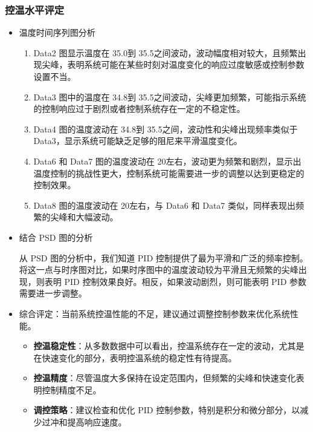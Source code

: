\documentclass[dvipsnames, svgnames,a4paper,11pt]{article}
\begin{document}
	\subsubsection{控温水平评定}
	\begin{itemize}
		\item 温度时间序列图分析
		\begin{enumerate}
			\item Data2 图显示温度在 35.0\degree 到 35.5\degree 之间波动，波动幅度相对较大，且频繁出现尖峰，表明系统可能在某些时刻对温度变化的响应过度敏感或控制参数设置不当。
			
			\item Data3 图中的温度在 34.8\degree 到 35.5\degree 之间波动，尖峰更加频繁，可能指示系统的控制响应过于剧烈或者控制系统存在一定的不稳定性。
			
			\item Data4 图的温度波动在 34.8\degree 到 35.5\degree 之间，波动性和尖峰出现频率类似于 Data3，显示系统可能缺乏足够的阻尼来平滑温度变化。
			
			\item Data6 和 Data7 图的温度波动在 20\degree 左右，波动更为频繁和剧烈，显示出温度控制的挑战性更大，控制系统可能需要进一步的调整以达到更稳定的控制效果。
			
			\item Data8 图的温度波动在 20\degree 左右，与 Data6 和 Data7 类似，同样表现出频繁的尖峰和大幅波动。
		\end{enumerate}
		
		\item 结合 PSD 图的分析
		
		从 PSD 图的分析中，我们知道 PID 控制提供了最为平滑和广泛的频率控制。将这一点与时序图对比，如果时序图中的温度波动较为平滑且无频繁的尖峰出现，则表明 PID 控制效果良好。相反，如果波动剧烈，则可能表明 PID 参数需要进一步调整。
		
		
		\item 综合评定：当前系统控温性能的不足，建议通过调整控制参数来优化系统性能。
		\begin{itemize}
			\item \textbf{控温稳定性}：从多数数据中可以看出，控温系统存在一定的波动，尤其是在快速变化的部分，表明控温系统的稳定性有待提高。
			
			\item \textbf{控温精度}：尽管温度大多保持在设定范围内，但频繁的尖峰和快速变化表明控制精度不足。
			
			\item \textbf{调控策略}：建议检查和优化 PID 控制参数，特别是积分和微分部分，以减少过冲和提高响应速度。
		\end{itemize}
	\end{itemize}
	
\end{document}

